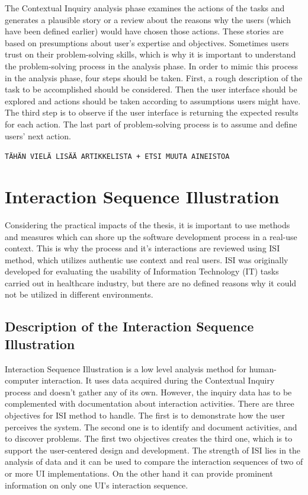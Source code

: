 \documentclass[12pt,a4paper,oneside,pdftex]{report}
\begin{document}
The Contextual Inquiry analysis phase examines the actions of the tasks and generates a plausible story or a review about the reasons why the users (which have been defined earlier) would have chosen those actions. These stories are based on presumptions about user's expertise and objectives. Sometimes users trust on their problem-solving skills, which is why it is important to understand the problem-solving process in the analysis phase. In order to mimic this process in the analysis phase, four steps should be taken. First, a rough description of the task to be accomplished should be considered. Then the user interface should be explored and actions should be taken according to assumptions users might have. The third step is to observe if the user interface is returning the expected results for each action. The last part of problem-solving process is to assume and define users' next action.\cite{RefWorks:26}

\texttt{TÄHÄN VIELÄ LISÄÄ ARTIKKELISTA + ETSI MUUTA AINEISTOA}

\section{Interaction Sequence Illustration}
\label{sec:isi}
Considering the practical impacts of the thesis, it is important to use methods and measures which can shore up the software development process in a real-use context. This is why the process and it's interactions are reviewed using ISI method, which utilizes 				authentic use context and real users. \cite{RefWorks:17} ISI was originally developed for evaluating the usability of Information Technology (IT) tasks carried out in healthcare industry, but there are no defined reasons why it could not be utilized in different environments.

\subsection{Description of the Interaction Sequence Illustration}
Interaction Sequence Illustration is a low level analysis method for human-computer interaction. It uses data acquired during the Contextual Inquiry process and doesn't gather any of its own. However, the inquiry data has to be complemented with documentation 			about 	interaction activities. There are three objectives for ISI method to handle. The first is to demonstrate how the user perceives the system. The second one is to identify and document activities, and to discover problems. The first two objectives creates the 			third one, which is to support the user-centered design and development. \cite{RefWorks:17}  The strength of ISI lies in the analysis of data and it can be used to compare the interaction sequences of two of or more UI implementations. On the other hand it can 			provide prominent information on only one UI's interaction sequence. 
\end{document}

